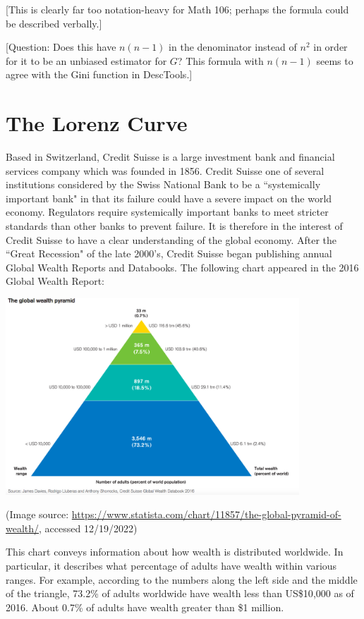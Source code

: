 \documentclass[12pt]{memoir}\usepackage[]{graphicx}\usepackage[table]{xcolor}
\begin{document}
[This is clearly far too notation-heavy for Math 106; perhaps the formula could be
described verbally.]

[Question: Does this have $n(n - 1)$ in the denominator instead of $n^2$ in order for it to
be an unbiased estimator for $G$?  This formula with $n(n - 1)$ seems to agree with the
Gini function in DescTools.]

\newpage
\section*{The Lorenz Curve}
\bigskip

Based in Switzerland, Credit Suisse is a large investment bank and financial 
services company which was founded in 1856.  Credit Suisse one of several institutions
considered by the Swiss National Bank to be a ``systemically important bank" in that
its failure could have a severe impact on the world economy.  Regulators require
systemically important banks to meet stricter standards than other banks to
prevent failure.  It is therefore in the interest of Credit Suisse to have a
clear understanding of the global economy.  After the ``Great Recession"
of the late 2000's, Credit Suisse began publishing annual Global Wealth Reports
and Databooks.   The following chart appeared in the 2016 Global Wealth Report:

\begin{center}
\includegraphics[width = 11cm]{graphs/globalwealthpyramid2016.png}
\end{center}
(Image source:  {\scriptsize \url{https://www.statista.com/chart/11857/the-global-pyramid-of-wealth/}, 
accessed 12/19/2022})

This chart conveys information about how wealth is distributed worldwide.
In particular, it describes what percentage of adults have wealth within
various ranges.  For example, according to the numbers along the left side and the 
middle of the triangle, 73.2\% of adults worldwide have wealth less than 
US\$10{,}000 as of 2016.  About 0.7\% of 
adults have wealth greater than \$1 million.  
\end{document}
